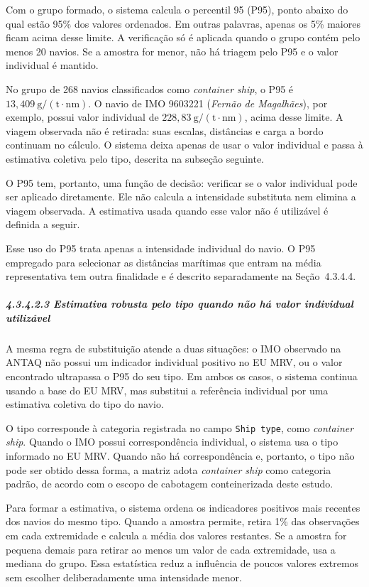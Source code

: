 \documentclass[brazil,]{article}
\let\oldsubparagraph\subparagraph
\renewcommand{\subparagraph}[1]{\Needspace{6\baselineskip}\oldsubparagraph{#1}\mbox{}}
\begin{document}
Com o grupo formado, o sistema calcula o percentil 95 (P95), ponto
abaixo do qual estão 95\% dos valores ordenados. Em outras palavras,
apenas os 5\% maiores ficam acima desse limite. A verificação só é
aplicada quando o grupo contém pelo menos 20 navios. Se a amostra for
menor, não há triagem pelo P95 e o valor individual é mantido.

No grupo de 268 navios classificados como \emph{container ship}, o P95
é \(13{,}409\ \mathrm{g/(t\cdot nm)}\). O navio de IMO 9603221
(\emph{Fernão de Magalhães}), por exemplo, possui valor individual de
\(228{,}83\ \mathrm{g/(t\cdot nm)}\), acima desse limite. A viagem
observada não é retirada: suas escalas, distâncias e carga a bordo
continuam no cálculo. O sistema deixa apenas de usar o valor individual
e passa à estimativa coletiva pelo tipo, descrita na subseção seguinte.

O P95 tem, portanto, uma função de decisão: verificar se o valor
individual pode ser aplicado diretamente. Ele não calcula a intensidade
substituta nem elimina a viagem observada. A estimativa usada quando
esse valor não é utilizável é definida a seguir.

Esse uso do P95 trata apenas a intensidade individual do navio. O P95
empregado para selecionar as distâncias marítimas que entram na média
representativa tem outra finalidade e é descrito separadamente na
Seção~4.3.4.4.

\hypertarget{estimativa-robusta-pelo-tipo-quando-nuxe3o-huxe1-valor-individual-utilizuxe1vel}{%
\subparagraph{4.3.4.2.3 Estimativa robusta pelo tipo quando não há valor
individual utilizável}\label{estimativa-robusta-pelo-tipo-quando-nuxe3o-huxe1-valor-individual-utilizuxe1vel}}

A mesma regra de substituição atende a duas situações: o IMO observado
na ANTAQ não possui um indicador individual positivo no EU MRV, ou o
valor encontrado ultrapassa o P95 do seu tipo. Em ambos os casos, o
sistema continua usando a base do EU MRV, mas substitui a referência
individual por uma estimativa coletiva do tipo do navio.

O tipo corresponde à categoria registrada no campo \texttt{Ship type},
como \emph{container ship}. Quando o IMO possui correspondência
individual, o sistema usa o tipo informado no EU MRV. Quando não há
correspondência e, portanto, o tipo não pode ser obtido dessa forma, a
matriz adota \emph{container ship} como categoria padrão, de acordo com
o escopo de cabotagem conteinerizada deste estudo.

Para formar a estimativa, o sistema ordena os indicadores positivos mais
recentes dos navios do mesmo tipo. Quando a amostra permite, retira 1\%
das observações em cada extremidade e calcula a média dos valores
restantes. Se a amostra for pequena demais para retirar ao menos um valor
de cada extremidade, usa a mediana do grupo. Essa estatística reduz a
influência de poucos valores extremos sem escolher deliberadamente uma
intensidade menor.
\end{document}
